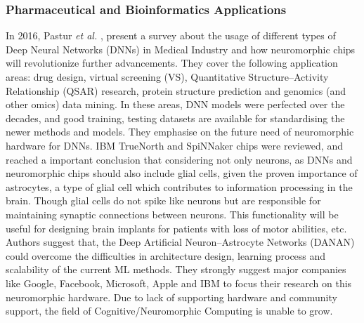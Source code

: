 \documentclass[11pt,twoside]{article}
\begin{document}
\subsubsection{Pharmaceutical and Bioinformatics Applications}
In 2016, Pastur \textit{et al.} \cite{pastur2016deep}, present a survey about the usage of different types of Deep Neural Networks (DNNs) in Medical Industry and how neuromorphic chips will revolutionize further advancements. They cover the following application areas: drug design, virtual screening (VS), Quantitative Structure–Activity Relationship (QSAR) research, protein structure prediction and genomics (and other omics) data mining. In these areas, DNN models were perfected over the decades, and good training, testing datasets are available for standardising the newer methods and models. They emphasise on the future need of neuromorphic hardware for DNNs. IBM TrueNorth and SpiNNaker chips were reviewed, and reached a important conclusion that considering not only neurons, as DNNs and neuromorphic chips should also include glial cells, given the proven importance of astrocytes, a type of glial cell which contributes to information processing in the brain. Though glial cells do not spike like neurons but are responsible for maintaining synaptic connections between neurons. This functionality will be useful for designing brain implants for patients with loss of motor abilities, etc. Authors suggest that, the Deep Artificial Neuron–Astrocyte Networks (DANAN) could overcome the difficulties in architecture design, learning process and scalability of the current ML methods. They strongly suggest major companies like Google, Facebook, Microsoft, Apple and IBM to focus their research on this neuromorphic hardware. Due to lack of supporting hardware and community support, the field of Cognitive/Neuromorphic Computing is unable to grow.


\end{document}
